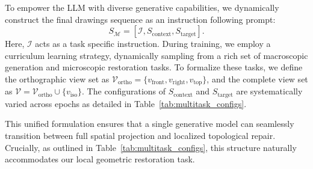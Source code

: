 \documentclass{article}
\begin{document}
To empower the LLM with diverse generative capabilities, we dynamically construct the final drawings sequence as an instruction following prompt:
\begin{equation}
    S_{\mathcal{M}} = [\mathcal{I}, S_{\text{context}}, S_{\text{target}}] .
\end{equation}
Here, $\mathcal{I}$ acts as a task specific instruction. During training, we employ a curriculum learning strategy, dynamically sampling from a rich set of macroscopic generation and microscopic restoration tasks. To formalize these tasks, we define the orthographic view set as $\mathcal{V}_{\text{ortho}} = \{v_{\text{front}}, v_{\text{right}}, v_{\text{top}}\}$, and the complete view set as $\mathcal{V} = \mathcal{V}_{\text{ortho}} \cup \{v_{\text{iso}}\}$. The configurations of $S_{\text{context}}$ and $S_{\text{target}}$ are systematically varied across epochs as detailed in Table~\ref{tab:multitask_configs}.

\begin{table}[h]
\centering
\caption{Summary of unified multitask configurations. $\mathcal{V}_{\text{ortho}}$ denotes the set of orthographic views, and $v_i$ represents a single orthographic view.}
\label{tab:multitask_configs}
\end{table}

This unified formulation ensures that a single generative model can seamlessly transition between full spatial projection and localized topological repair. Crucially, as outlined in Table~\ref{tab:multitask_configs}, this structure naturally accommodates our local geometric restoration task.
\end{document}
